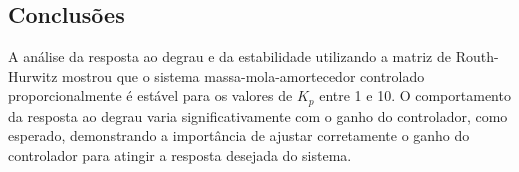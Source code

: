 \subsection{Conclusões}
A análise da resposta ao degrau e da estabilidade utilizando a matriz de Routh-Hurwitz mostrou que o sistema massa-mola-amortecedor controlado proporcionalmente é estável para os valores de \( K_p \) entre 1 e 10. O comportamento da resposta ao degrau varia significativamente com o ganho do controlador, como esperado, demonstrando a importância de ajustar corretamente o ganho do controlador para atingir a resposta desejada do sistema.
